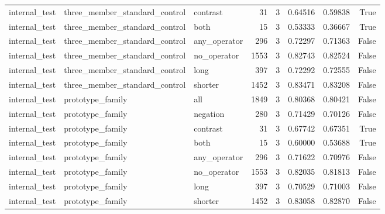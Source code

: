 \begin{tabular}{lllrrrrr}
internal\_test & three\_member\_standard\_control & contrast & 31 & 3 & 0.64516 & 0.59838 & True \\
internal\_test & three\_member\_standard\_control & both & 15 & 3 & 0.53333 & 0.36667 & True \\
internal\_test & three\_member\_standard\_control & any\_operator & 296 & 3 & 0.72297 & 0.71363 & False \\
internal\_test & three\_member\_standard\_control & no\_operator & 1553 & 3 & 0.82743 & 0.82524 & False \\
internal\_test & three\_member\_standard\_control & long & 397 & 3 & 0.72292 & 0.72555 & False \\
internal\_test & three\_member\_standard\_control & shorter & 1452 & 3 & 0.83471 & 0.83208 & False \\
internal\_test & prototype\_family & all & 1849 & 3 & 0.80368 & 0.80421 & False \\
internal\_test & prototype\_family & negation & 280 & 3 & 0.71429 & 0.70126 & False \\
internal\_test & prototype\_family & contrast & 31 & 3 & 0.67742 & 0.67351 & True \\
internal\_test & prototype\_family & both & 15 & 3 & 0.60000 & 0.53688 & True \\
internal\_test & prototype\_family & any\_operator & 296 & 3 & 0.71622 & 0.70976 & False \\
internal\_test & prototype\_family & no\_operator & 1553 & 3 & 0.82035 & 0.81813 & False \\
internal\_test & prototype\_family & long & 397 & 3 & 0.70529 & 0.71003 & False \\
internal\_test & prototype\_family & shorter & 1452 & 3 & 0.83058 & 0.82870 & False \\
\bottomrule
\end{tabular}
